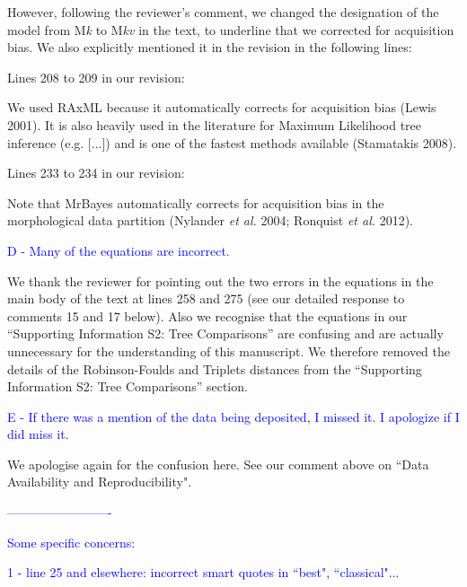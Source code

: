 \documentclass[11pt]{letter}
\begin{document}
\begin{letter}{}
However, following the reviewer's comment, we changed the designation of the model from M\textit{k} to M\textit{kv} in the text, to underline that we corrected for acquisition bias. We also explicitly mentioned it in the revision in the following lines:

Lines 208 to 209 in our revision:

\hfill\begin{minipage}{\dimexpr\textwidth-1cm}
We used RAxML because it automatically corrects for acquisition bias (Lewis 2001). It is also heavily used in the literature for Maximum Likelihood tree inference (e.g. [...]) and is one of the fastest methods available (Stamatakis 2008).
\end{minipage}

Lines 233 to 234 in our revision:

\hfill\begin{minipage}{\dimexpr\textwidth-1cm}
Note that MrBayes automatically corrects for acquisition bias in the morphological data partition (Nylander \textit{et al.} 2004; Ronquist \textit{et al.} 2012).
\end{minipage}


\textcolor{blue}{D - Many of the equations are incorrect.}

We thank the reviewer for pointing out the two errors in the equations in the main body of the text at lines 258 and 275 (see our detailed response to comments 15 and 17 below). Also we recognise that the equations in our ``Supporting Information S2: Tree Comparisons'' are confusing and are actually unnecessary for the understanding of this manuscript. We therefore removed the details of the Robinson-Foulds and Triplets distances from the ``Supporting Information S2: Tree Comparisons'' section.


\textcolor{blue}{E - If there was a mention of the data being deposited, I missed it. I apologize if I did miss it.}

We apologise again for the confusion here. See our comment above on ``Data Availability and Reproducibility".


\textcolor{blue}{-------------------------}

\textcolor{blue}{Some specific concerns:}

\textcolor{blue}{1 - line 25 and elsewhere: incorrect smart quotes in ``best", ``classical"...}


\end{letter}
\end{document}
